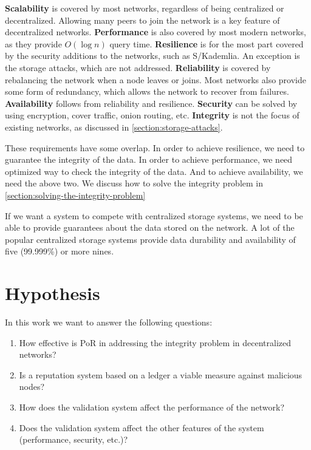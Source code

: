 \textbf{Scalability} is covered by most networks, regardless of being centralized or decentralized.
Allowing many peers to join the network is a key feature of decentralized networks.
\textbf{Performance} is also covered by most modern networks, as they provide $O(\log n)$ query time.
\textbf{Resilience} is for the most part covered by the security additions to the networks, such as S/Kademlia.
An exception is the storage attacks, which are not addressed.
\textbf{Reliability} is covered by rebalancing the network when a node leaves or joins.
Most networks also provide some form of redundancy, which allows the network to recover from failures.
\textbf{Availability} follows from reliability and resilience.
\textbf{Security} can be solved by using encryption, cover traffic, onion routing, etc.
\textbf{Integrity} is not the focus of existing networks, as discussed in \ref{section:storage-attacks}.

These requirements have some overlap.
In order to achieve resilience, we need to guarantee the integrity of the data.
In order to achieve performance, we need optimized way to check the integrity of the data.
And to achieve availability, we need the above two.
We discuss how to solve the integrity problem in \autoref{section:solving-the-integrity-problem}

If we want a system to compete with centralized storage systems, we
need to be able to provide guarantees about the data stored on the network.
A lot of the popular centralized storage systems provide data durability and
availability of five (99.999\%) or more nines.

\section{Hypothesis}

In this work we want to answer the following questions:
\begin{enumerate}
    \item How effective is PoR in addressing the integrity problem in decentralized networks?
    \item Is a reputation system based on a ledger a viable measure against malicious nodes?
    \item How does the validation system affect the performance of the network?
    \item Does the validation system affect the other features of the system (performance, security, etc.)?
\end{enumerate}

